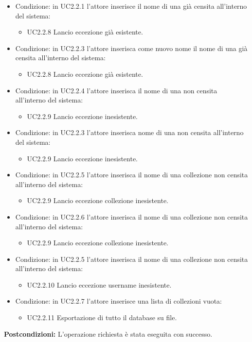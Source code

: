 \documentclass{scalatekids-article}
\begin{document}
\begin{itemize}
\item Condizione: in UC2.2.1 l'attore inserisce il nome di una  già censita all'interno del sistema:
  \begin{itemize}
  \item UC2.2.8 Lancio eccezione  già esistente.
  \end{itemize}
\item Condizione: in UC2.2.3  l'attore inserisca come nuovo nome il nome di una  già censita all'interno del sistema:
  \begin{itemize}
  \item UC2.2.8 Lancio eccezione  già esistente.
  \end{itemize}
\item Condizione: in UC2.2.4 l'attore inserisca il nome di una  non censita all'interno del sistema:
  \begin{itemize}
  \item UC2.2.9 Lancio eccezione  inesistente.
  \end{itemize}
\item Condizione: in UC2.2.3 l'attore inserisca nome di una  non censita all'interno del sistema:
  \begin{itemize}
  \item UC2.2.9 Lancio eccezione  inesistente.
  \end{itemize}
\item Condizione: in UC2.2.5 l'attore inserisca il nome di una collezione non censita all'interno del sistema:
  \begin{itemize}
  \item UC2.2.9 Lancio eccezione collezione inesistente.
  \end{itemize}
\item Condizione: in UC2.2.6 l'attore inserisca il nome di una collezione non censita all'interno del sistema:
  \begin{itemize}
  \item UC2.2.9 Lancio eccezione collezione inesistente.
  \end{itemize}
\item Condizione: in UC2.2.5 l'attore inserisca il nome di una collezione non censita all'interno del sistema:
  \begin{itemize}
  \item UC2.2.10 Lancio eccezione username inesistente.
  \end{itemize}
\item Condizione: in UC2.2.7 l'attore inserisce una lista di collezioni vuota:
  \begin{itemize}
  \item UC2.2.11 Esportazione di tutto il database su file.
  \end{itemize}
\end{itemize}
\textbf{Postcondizioni:} L'operazione richiesta è stata eseguita con successo.
\end{document}
